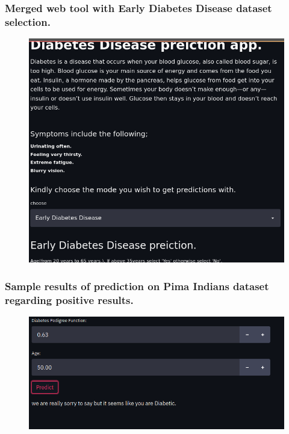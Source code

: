 \documentclass[11pt]{article}
\begin{document}
\subsubsection{Merged web tool with Early Diabetes Disease dataset selection.}
\begin{figure}[h]
	\centerline{\small 
		\includegraphics[height=0.3\textheight]  {Emerged}}
\end{figure}

\newpage
\subsubsection{Sample results of prediction on Pima Indians dataset regarding positive results.}
\begin{figure}[h]
	\centerline{\small 
		\includegraphics[height=0.25\textheight]  {Ppos}}
\end{figure}
\end{document}
